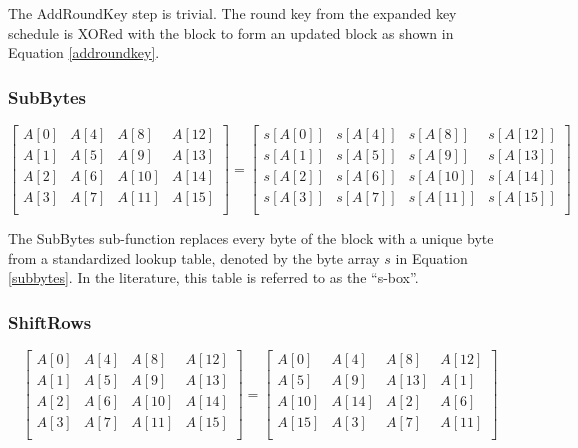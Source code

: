 \documentclass[a4paper,10pt]{article}
\begin{document}
The AddRoundKey step is trivial.  The round key from the expanded key schedule is XORed with the block to form an updated block as shown in Equation \eqref{addroundkey}.

\subsubsection{SubBytes}


\begin{equation}
 \begin{bmatrix}
  A[0] & A[4] & A[8] & A[12] \\
  A[1] & A[5] & A[9] & A[13] \\
  A[2] & A[6] & A[10] & A[14] \\
  A[3] & A[7] & A[11] & A[15] \\
 \end{bmatrix}
 =
 \begin{bmatrix}
  s[A[0]] & s[A[4]] & s[A[8]] & s[A[12]] \\
  s[A[1]] & s[A[5]] & s[A[9]] & s[A[13]] \\
  s[A[2]] & s[A[6]] & s[A[10]] & s[A[14]] \\
  s[A[3]] & s[A[7]] & s[A[11]] & s[A[15]] \\
 \end{bmatrix}
\label{subbytes}
\end{equation}

The SubBytes sub-function replaces every byte of the block with a unique byte from a standardized lookup table, denoted by the byte array $s$ in Equation \eqref{subbytes}.  In the literature, this table is referred to as the ``s-box''.

\subsubsection{ShiftRows}

\begin{equation}
 \begin{bmatrix}
  A[0] & A[4] & A[8] & A[12] \\
  A[1] & A[5] & A[9] & A[13] \\
  A[2] & A[6] & A[10] & A[14] \\
  A[3] & A[7] & A[11] & A[15] \\
 \end{bmatrix}
 =
 \begin{bmatrix}
  A[0] & A[4] & A[8] & A[12] \\
  A[5] & A[9] & A[13] & A[1] \\
  A[10] & A[14] & A[2] & A[6] \\
  A[15] & A[3] & A[7] & A[11] \\
 \end{bmatrix}
\label{shiftrows}
\end{equation}
\end{document}
